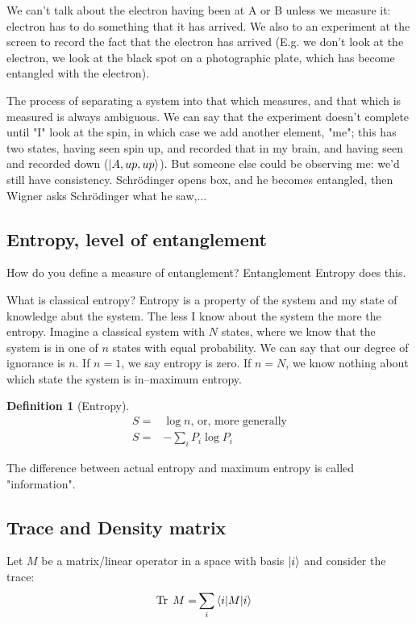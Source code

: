 \documentclass[]{article}
\newtheorem{defn}[thm]{Definition}
\DeclareMathOperator{\Tr}{Tr \;}
\begin{document}
We can't talk about the electron having been at A or B unless we measure it: electron has to do something that it has arrived. We also to an experiment at the screen to record the fact that the electron has arrived (E.g. we don't look at the electron, we look at the black spot on a photographic plate, which has become entangled with the electron).

The process of separating a system into that which measures, and that which is measured is always ambiguous. We can say that the experiment doesn't complete until "I" look at the spin, in which case we add another element, "me"; this has two states, having seen spin up, and recorded that in my brain, and having seen and recorded down ($\ket{A,up,up}$). But someone else could be observing me: we'd still have consistency. Schr\"odinger opens box, and he becomes entangled, then Wigner asks Schr\"odinger what he saw,...

\subsection{Entropy, level of entanglement}  

How do you define a measure of entanglement? Entanglement Entropy does this.

What is classical entropy? Entropy is a property of the system and my state of knowledge abut the system. The less I know about the system the more the entropy. Imagine a classical system with $N$ states, where we know that the system is in one of $n$ states with equal probability. We can say that our degree of ignorance is $n$. If $n=1$, we say entropy is zero. If $n=N$, we know nothing about which state the system is in--maximum entropy.
\begin{defn}[Entropy]
	\begin{align*}
		S=&\log{n}\text{, or, more generally}\\
		S =&- \sum_i P_i \log{P_i}
	\end{align*}
\end{defn}

The difference between actual entropy and maximum entropy is called "information".

\subsection{Trace and Density matrix }

Let $M$ be a matrix/linear operator in a space with basis $\ket{i}$ and consider the trace:
\begin{align*}
	\Tr M =& \sum_i \braket{i\vert M \vert i}
\end{align*}
\end{document}
